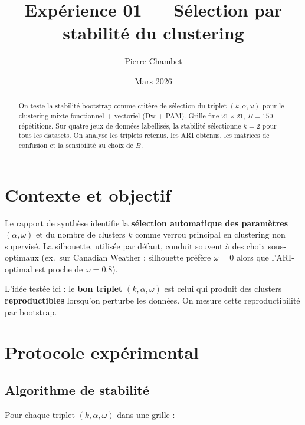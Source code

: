 \documentclass[11pt, a4paper]{article}
\title{Expérience 01 — Sélection par stabilité du clustering}
\author{Pierre Chambet}
\date{Mars 2026}
\begin{document}
\maketitle

\begin{abstract}
On teste la stabilité bootstrap comme critère de sélection du triplet
$(k, \alpha, \omega)$ pour le clustering mixte fonctionnel + vectoriel
(Dw + PAM). Grille fine $21 \times 21$, $B = 150$ répétitions. Sur quatre
jeux de données labellisés, la stabilité sélectionne $k = 2$ pour tous les
datasets. On analyse les triplets retenus, les ARI obtenus, les matrices de
confusion et la sensibilité au choix de $B$.
\end{abstract}

\tableofcontents
\newpage

\section{Contexte et objectif}

Le rapport de synthèse identifie la \textbf{sélection automatique des
paramètres} $(\alpha, \omega)$ et du nombre de clusters $k$ comme verrou
principal en clustering non supervisé. La silhouette, utilisée par défaut,
conduit souvent à des choix sous-optimaux (ex.\ sur Canadian Weather :
silhouette préfère $\omega = 0$ alors que l'ARI-optimal est proche de
$\omega = 0.8$).

L'idée testée ici : le \textbf{bon triplet} $(k, \alpha, \omega)$ est celui
qui produit des clusters \textbf{reproductibles} lorsqu'on perturbe les
données. On mesure cette reproductibilité par bootstrap.

\section{Protocole expérimental}

\subsection{Algorithme de stabilité}

Pour chaque triplet $(k, \alpha, \omega)$ dans une grille :
\end{document}
